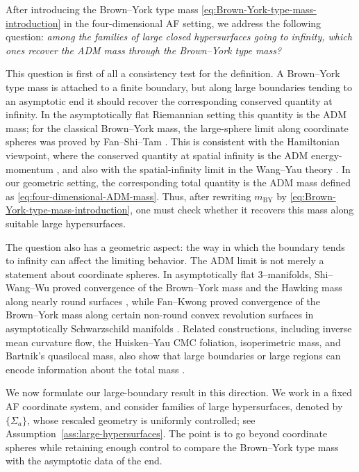 \documentclass[10pt]{amsart}
\newcommand{\BY}{\mathrm{BY}}
\theoremstyle{plain}
\theoremstyle{remark}
\begin{document}
	After introducing the Brown--York type mass \eqref{eq:Brown-York-type-mass-introduction} in the four-dimensional AF setting, we address the
	following question: \textit{among the families of large closed hypersurfaces going to infinity, which ones recover the ADM mass through the Brown--York type mass?}
	
	This question is first of all a consistency test for the definition. A
	Brown--York type mass is attached to a finite boundary, but along large
	boundaries tending to an asymptotic end it should recover the corresponding
	conserved quantity at infinity. In the asymptotically flat Riemannian setting
	this quantity is the ADM mass; for the classical Brown--York mass, the
	large-sphere limit along coordinate spheres was proved by Fan--Shi--Tam
	\cite{FanShiTam}. This is consistent with the Hamiltonian viewpoint, where the
	conserved quantity at spatial infinity is the ADM energy-momentum
	\cite{ADM,Szabados}, and also with the spatial-infinity limit in the
	Wang--Yau theory \cite{WangYau,WangYau09}. In our geometric setting, the corresponding
	total quantity is the ADM mass defined as \eqref{eq:four-dimensional-ADM-mass}. Thus, after rewriting $m_{\BY}$ by \eqref{eq:Brown-York-type-mass-introduction}, one must check
	whether it recovers this mass along suitable large hypersurfaces.
	
	The question also has a geometric aspect: the way in which the boundary
	tends to infinity can affect the limiting behavior. The ADM limit is not merely
	a statement about coordinate spheres. In asymptotically flat $3$--manifolds,
	Shi--Wang--Wu proved convergence of the Brown--York mass and the Hawking mass
	along nearly round surfaces \cite{ShiWangWu}, while Fan--Kwong proved
	convergence of the Brown--York mass along certain non-round convex revolution
	surfaces in asymptotically Schwarzschild manifolds
	\cite{FanKwong11,FanKwong13}. Related constructions, including inverse mean
	curvature flow, the Huisken--Yau CMC foliation, isoperimetric mass, and
	Bartnik's quasilocal mass, also show that large boundaries or large regions can
	encode information about the total mass
	\cite{HuiskenIlmanen,HuiskenYau,JaureguiLee,Bartnik89,McCormick24}.
	
	We now formulate our large-boundary result in this direction. We work in
	a fixed AF coordinate system, and consider families of large hypersurfaces, denoted by $\{\Sigma_a\}$, whose rescaled
	geometry is uniformly controlled; see Assumption~\ref{ass:large-hypersurfaces}. The point is to go beyond coordinate spheres while retaining enough control to compare the Brown--York type mass
	with the asymptotic data of the end.
	
\end{document}
